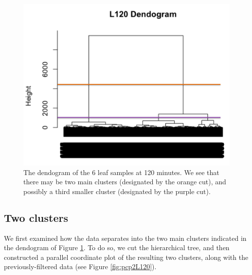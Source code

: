 \documentclass[11pt,a4paper,oldfontcommands,openany]{memoir}
\numberwithin{equation}{section} %
\begin{document}
\begin{figure}[H]
    \begin{framed}
    \centering
    \includegraphics[width=\textwidth]{dendL120}
    \end{framed}
    \caption{The dendogram of the 6 leaf samples at 120 minutes. We see that there may be two main clusters (designated by the orange cut), and possibly a third smaller cluster (designated by the purple cut).}
    \label{fig:dendL120}
\end{figure}

\subsection{Two clusters}

We first examined how the data separates into the two main clusters indicated in the dendogram of Figure \ref{fig:dendL120}. To do so, we cut the hierarchical tree, and then constructed a parallel coordinate plot of the resulting two clusters, along with the previously-filtered data (see Figure \ref{fig:pcp2L120}).

\clearpage
\end{document}
